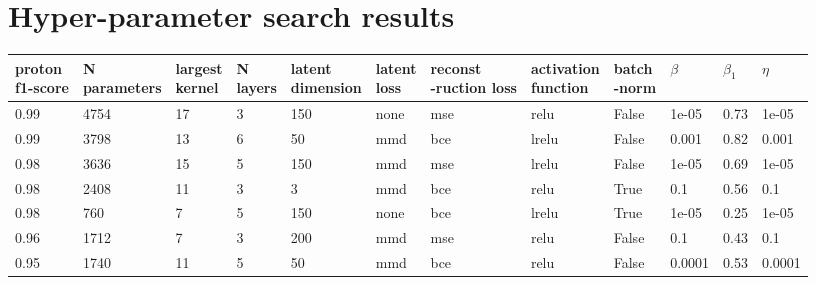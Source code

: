 \chapter{Hyper-parameter search results}\label{appendix:hyperparams}
\setlength{\LTleft}{-0.9in}
\begin{longtable}{llllllllllll}
\toprule
\MyHead{0.7cm}{proton\\f1-score} & \MyHead{1.8cm}{N \\parameters} & \MyHead{0.9cm}{largest\\kernel} & \MyHead{0.6cm}{N\\layers} & \MyHead{1.5cm}{latent\\ dimension} & \MyHead{0.6cm}{latent\\loss} &\MyHead{1.5cm}{reconst\\-ruction loss} & \MyHead{2cm}{activation\\function} & \MyHead{1.5cm}{batch\\-norm} & $\beta$ & $\beta_1$ &  $\eta$  \\
\midrule \endhead
           0.99 &         4754 &             17 &        3 &              150 &        none &                 mse &                relu &     False &   1e-05 &      0.73 &  1e-05 \\
           0.99 &         3798 &             13 &        6 &               50 &         mmd &                 bce &               lrelu &     False &   0.001 &      0.82 &  0.001 \\
           0.98 &         3636 &             15 &        5 &              150 &         mmd &                 mse &               lrelu &     False &   1e-05 &      0.69 &  1e-05 \\
           0.98 &         2408 &             11 &        3 &                3 &         mmd &                 bce &                relu &      True &     0.1 &      0.56 &    0.1 \\
           0.98 &          760 &              7 &        5 &              150 &        none &                 bce &               lrelu &      True &   1e-05 &      0.25 &  1e-05 \\
           0.96 &         1712 &              7 &        3 &              200 &         mmd &                 mse &                relu &     False &     0.1 &      0.43 &    0.1 \\
           0.95 &         1740 &             11 &        5 &               50 &         mmd &                 bce &                relu &     False &  0.0001 &      0.53 & 0.0001 \\

\end{longtable}
